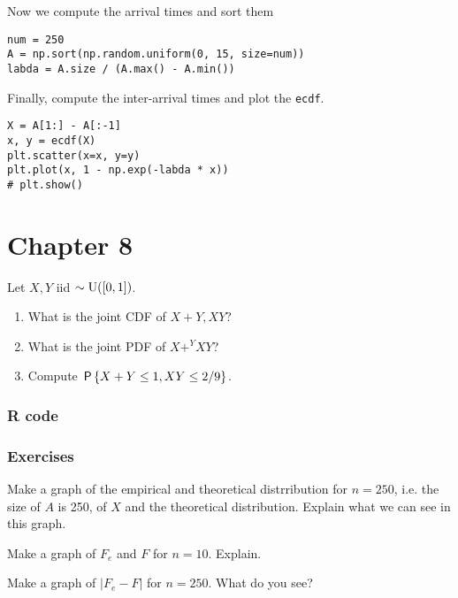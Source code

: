 \documentclass[a4paper]{article}
\begin{document}
Now we compute the arrival times and sort them

\begin{verbatim}
num = 250
A = np.sort(np.random.uniform(0, 15, size=num))
labda = A.size / (A.max() - A.min()) 
\end{verbatim}

Finally, compute the inter-arrival times and plot the \texttt{ecdf}.
\begin{verbatim}
X = A[1:] - A[:-1]
x, y = ecdf(X)
plt.scatter(x=x, y=y)
plt.plot(x, 1 - np.exp(-labda * x))
# plt.show()

\end{verbatim}

\section{Chapter 8}
\label{sec:chapter-8}

\begin{exercise}
Let $X, Y$ iid $\sim \Unif{[0,1]}$. 
\begin{enumerate}
\item What is the joint CDF of $X+Y, XY$?
\item What is the joint PDF of $X+^Y XY$?
\item Compute $\P{X+Y\leq 1, XY\leq 2/9}$.
\end{enumerate}
\end{exercise}


\subsubsection*{R code}
\label{sec:orgbbfd4db}


\subsubsection{Exercises}
\label{sec:org27b4ea4}
\begin{exercise}
Make a graph of the empirical and theoretical distrribution for $n=250$, i.e. the size of $A$ is 250, of $X$ and the theoretical distribution. Explain what we can see in this graph. 
\end{exercise}

\begin{exercise}
Make a graph of $F_e$ and $F$  for $n=10$. Explain. 
\end{exercise}

\begin{exercise}
Make a graph of  $|F_e - F|$  for $n=250$. What do you see?
\end{exercise}
\end{document}
